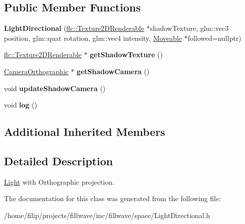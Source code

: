 \subsection*{Public Member Functions}
\begin{DoxyCompactItemize}
\item 
\mbox{\label{classflw_1_1flf_1_1LightDirectional_a09b4fc109a231d81fccf59834abb1d92}} 
{\bfseries Light\+Directional} (\hyperlink{classflw_1_1flc_1_1Texture2DRenderable}{flc\+::\+Texture2\+D\+Renderable} $\ast$shadow\+Texture, glm\+::vec3 position, glm\+::quat rotation, glm\+::vec4 intensity, \hyperlink{classflw_1_1flf_1_1Moveable}{Moveable} $\ast$followed=nullptr)
\item 
\mbox{\label{classflw_1_1flf_1_1LightDirectional_af5551815e42ffc40f2c6e0062effa783}} 
\hyperlink{classflw_1_1flc_1_1Texture2DRenderable}{flc\+::\+Texture2\+D\+Renderable} $\ast$ {\bfseries get\+Shadow\+Texture} ()
\item 
\mbox{\label{classflw_1_1flf_1_1LightDirectional_aac317eaf2b1e2666d16b3c56022d14b2}} 
\hyperlink{classflw_1_1flf_1_1CameraOrthographic}{Camera\+Orthographic} $\ast$ {\bfseries get\+Shadow\+Camera} ()
\item 
\mbox{\label{classflw_1_1flf_1_1LightDirectional_aa5878fe2e64882fffbaa79d4175fe7a2}} 
void {\bfseries update\+Shadow\+Camera} ()
\item 
\mbox{\label{classflw_1_1flf_1_1LightDirectional_a67447a8613048c46a43bac71738380d9}} 
void {\bfseries log} ()
\end{DoxyCompactItemize}
\subsection*{Additional Inherited Members}


\subsection{Detailed Description}
\hyperlink{classflw_1_1flf_1_1Light}{Light} with Orthographic projection. 

The documentation for this class was generated from the following file\+:\begin{DoxyCompactItemize}
\item 
/home/filip/projects/fillwave/inc/fillwave/space/Light\+Directional.\+h\end{DoxyCompactItemize}
